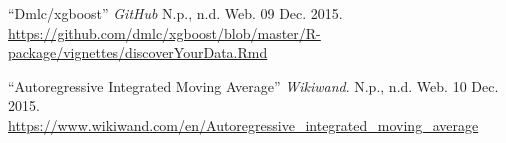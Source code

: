 \documentclass[12pt,a4paper]{article}
\begin{document}
\begin{thebibliography}{9}
	\enquote{Dmlc/xgboost} \textit {GitHub} N.p., n.d. Web. 09 Dec. 2015. \href{https://github.com/dmlc/xgboost/blob/master/R-package/vignettes/discoverYourData.Rmd}{\url{https://github.com/dmlc/xgboost/blob/master/R-package/vignettes/discoverYourData.Rmd}}
	
	\enquote{Autoregressive Integrated Moving Average} \textit{Wikiwand}. N.p., n.d. Web. 10 Dec. 2015.
	\href{https://www.wikiwand.com/en/Autoregressive_integrated_moving_average}{\url{https://www.wikiwand.com/en/Autoregressive_integrated_moving_average}}
	
\end{thebibliography}
\end{document}
